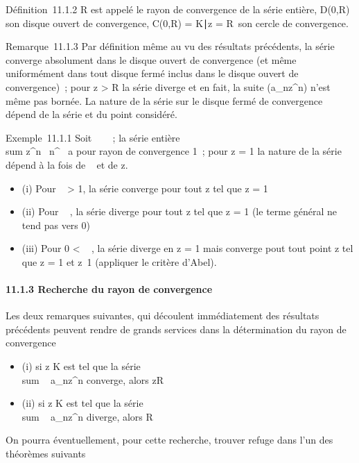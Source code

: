 \documentclass[]{article}
\begin{document}
Définition~11.1.2 R est appelé le rayon de convergence de la série
entière, D(0,R) son disque ouvert de convergence, C(0,R) =
\z \in K∣z
= R\ son cercle de convergence.

Remarque~11.1.3 Par définition même au vu des résultats précédents, la
série converge absolument dans le disque ouvert de convergence (et même
uniformément dans tout disque fermé inclus dans le disque ouvert de
convergence)~; pour z > R la série
diverge et en fait, la suite (a_nz^n) n'est même pas
bornée. La nature de la série sur le disque fermé de convergence dépend
de la série et du point considéré.

Exemple~11.1.1 Soit \alpha~ \in {}~~; la série entière
\\sum   z^n~
\over n^\alpha~ a pour rayon de convergence 1~;
pour z = 1 la nature de la série dépend à la fois de
\alpha~ et de z.

\begin{itemize}
\itemsep1pt\parskip0pt
\item
  (i) Pour \alpha~ > 1, la série converge pour tout z tel que
  z = 1
\item
  (ii) Pour \alpha~ , la série diverge pour tout z tel que
  z = 1 (le terme général ne tend pas vers 0)
\item
  (iii) Pour 0 < \alpha~ , la série diverge en z = 1 mais
  converge pout tout point z tel que z = 1 et
  z\neq~1 (appliquer le critère d'Abel).
\end{itemize}

\paragraph{11.1.3 Recherche du rayon de convergence}

Les deux remarques suivantes, qui découlent immédiatement des résultats
précédents peuvent rendre de grands services dans la détermination du
rayon de convergence

\begin{itemize}
\itemsep1pt\parskip0pt
\item
  (i) si z \in K est tel que la série
  \\sum ~
  a_nz^n converge, alors z\leq R
\item
  (ii) si z \in K est tel que la série
  \\sum ~
  a_nz^n diverge, alors R \leqz
\end{itemize}

On pourra éventuellement, pour cette recherche, trouver refuge dans l'un
des théorèmes suivants
\end{document}

